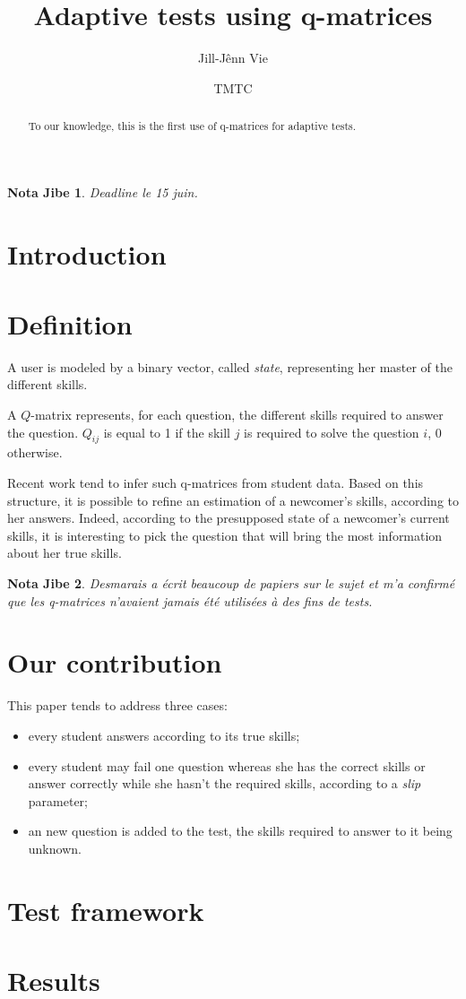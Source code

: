 \documentclass{article}
\title{Adaptive tests using q-matrices}
\author{Jill-Jênn Vie \and TMTC}
\newtheorem{jb}{Nota Jibe}
\begin{document}
\maketitle

\begin{abstract}
To our knowledge, this is the first use of q-matrices for adaptive tests.
\end{abstract}

\begin{jb}
Deadline le 15 juin.
\end{jb}

\section{Introduction}



\section{Definition}

A user is modeled by a binary vector, called \emph{state}, representing her master of the different skills.

A $Q$-matrix represents, for each question, the different skills required to answer the question. $Q_{ij}$ is equal to 1 if the skill $j$ is required to solve the question $i$, 0 otherwise.

Recent work tend to infer such q-matrices from student data. Based on this structure, it is possible to refine an estimation of a newcomer's skills, according to her answers. Indeed, according to the presupposed state of a newcomer's current skills, it is interesting to pick the question that will bring the most information about her true skills.

\begin{jb}
Desmarais a écrit beaucoup de papiers sur le sujet et m'a confirmé que les q-matrices n'avaient jamais été utilisées à des fins de tests.
\end{jb}

\section{Our contribution}

This paper tends to address three cases:
\begin{itemize}
\item every student answers according to its true skills;
\item every student may fail one question whereas she has the correct skills or answer correctly while she hasn't the required skills, according to a \emph{slip} parameter;
\item an new question is added to the test, the skills required to answer to it being unknown.
\end{itemize}

\section{Test framework}

\section{Results}
\end{document}
